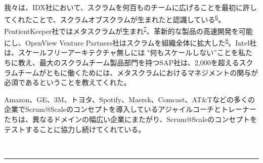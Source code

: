 \documentclass[12pt,a4paper,parskip=full]{scrartcl}
\begin{document}

我々は、IDX社において、スクラムを何百ものチームに広げることを最初に許してくれたことで、スクラムオブスクラムが生まれたと認識している\textsuperscript{\hyperref[citation6]{6}}。PentientKeeper社ではメタスクラムが生まれ\textsuperscript{\hyperref[citation7]{7}}、革新的な製品の高速開発を可能にし、OpenView Venture Partners社はスクラムを組織全体に拡大した\textsuperscript{\hyperref[citation8]{8}}。Intel社は、スケールフリーアーキテクチャ無しには "何もスケールしない”ことを私たちに教え、最大のスクラムチーム製品部門を持つSAP社は、2,000を超えるスクラムチームがともに働くためには、メタスクラムにおけるマネジメントの関与が必須であるということを教えてくれた。

Amazon、GE、3M、トヨタ、Spotify、Maersk、Comcast、AT\&Tなどの多くの企業でScrum@Scaleのコンセプトを導入しているアジャイルコーチとトレーナーたちは、異なるドメインの幅広い企業にまたがり、Scrum@Scaleのコンセプトをテストすることに協力し続けてくれている。

~
\pagebreak
\begin{center}\rule{3in}{0.4pt}\end{center}
\end{document}
